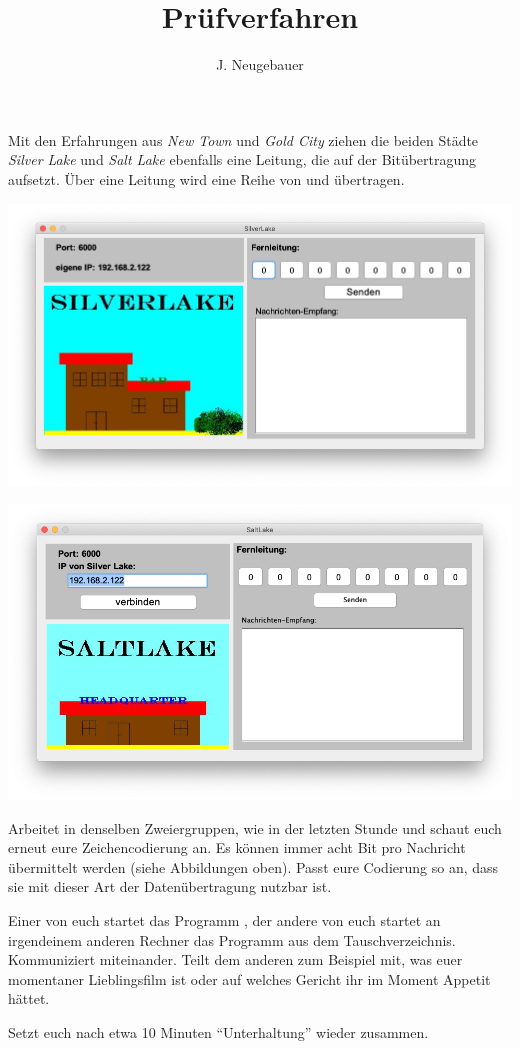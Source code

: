 \documentclass[10pt, a4paper]{scrartcl}
\author{J. Neugebauer}
\title{Prüfverfahren}
\date{\Heute}
\begin{document}
\ReiheTitel

Mit den Erfahrungen aus \emph{New Town} und \emph{Gold City} ziehen die beiden Städte \emph{Silver Lake} und \emph{Salt Lake} ebenfalls eine Leitung, die auf der Bitübertragung aufsetzt. Über eine Leitung wird eine Reihe von  und  übertragen.

\begin{multicols}{2}\centering
	\includegraphics[width=.9\columnwidth]{Q2-GK-AB.II.2-Abb_Silver Lake.png}

	\includegraphics[width=.9\columnwidth]{Q2-GK-AB.II.2-Abb_Saltlake.png}
\end{multicols}

\begin{aufgabe}
	Arbeitet in denselben Zweiergruppen, wie in der letzten Stunde und schaut euch erneut eure Zeichencodierung an. Es können immer acht Bit pro Nachricht übermittelt werden (siehe Abbildungen oben). Passt eure Codierung so an, dass sie mit dieser Art der Datenübertragung nutzbar ist.
\end{aufgabe}

\begin{aufgabe}
	Einer von euch startet das Programm , der andere von euch startet an irgendeinem anderen Rechner das Programm  aus dem Tauschverzeichnis. Kommuniziert miteinander. Teilt dem anderen zum Beispiel mit, was euer momentaner Lieblingsfilm ist oder auf welches Gericht ihr im Moment Appetit hättet.

	Setzt euch nach etwa 10 Minuten \enquote{Unterhaltung} wieder zusammen.
\end{aufgabe}
\end{document}
